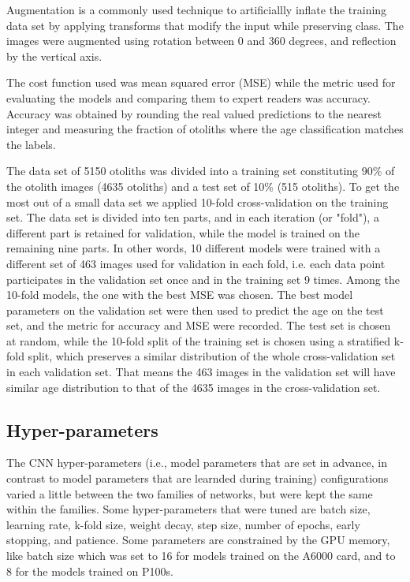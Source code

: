 \documentclass[10pt,letterpaper]{article}
\begin{document}
Augmentation is a commonly used technique to artificiallly inflate the training data set by applying transforms that modify the input while preserving class. The images were augmented using rotation between 0 and 360 degrees, and reflection by the vertical axis. 

The cost function used was mean squared error (MSE)
while the metric used for evaluating the models and comparing them to expert readers was accuracy. Accuracy was obtained by rounding the real valued predictions to the nearest integer and measuring the fraction of otoliths where the age classification matches the labels.

The data set of 5150 otoliths was divided into a training set constituting 90\% of the otolith images (4635 otoliths) and a test set of 10\% (515 otoliths).
To get the most out of a small data set we applied 10-fold cross-validation on the training set. The data set is divided into ten parts, and in each iteration (or "fold"), a different part is retained for validation, while the model is trained on the remaining nine parts. In other words, 10 different models were trained with a different set of 463 images used for validation in each fold, i.e. each data point participates in the validation set once and in the training set 9 times. Among the 10-fold models, the one with the best MSE was chosen. The best model parameters on the validation set were then used to predict the age on the test set, and the metric for accuracy and MSE were recorded. The test set is chosen at random, while the 10-fold split of the training set is chosen using a stratified k-fold split, which preserves a similar distribution of the whole cross-validation set in each validation set. That means the 463 images in the validation set will have similar age distribution to that of the 4635 images in the cross-validation set. 

\subsection{Hyper-parameters}

The CNN hyper-parameters (i.e., model parameters that are set in advance, in contrast to model parameters that are learnded during training) configurations varied a little between the two families of networks, but were kept the same within the families. Some hyper-parameters that were tuned are batch size, learning rate, k-fold size, weight decay, step size, number of epochs, early stopping, and patience. Some parameters are constrained by the GPU memory, like batch size which
was set to 16 for models trained on the A6000 card, and to 8 for the models trained on P100s.
\end{document}
